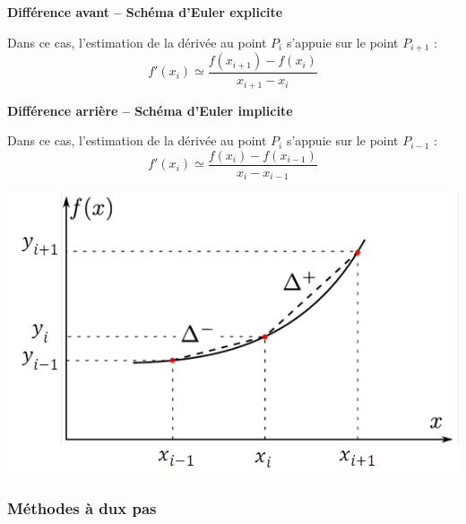 \documentclass[10pt]{article}
\begin{document}
\begin{minipage}[c]{.49\linewidth}
\begin{resultat}
\textbf{Différence avant -- Schéma d'Euler explicite}

Dans ce cas, l'estimation de la dérivée au point $P_i$ s'appuie sur le point $P_{i+1}$ :
$$
f'(x_i)\simeq\dfrac{f(x_{i+1})-f(x_i)}{x_{i+1}-x_i}
$$
\end{resultat}

\begin{resultat}
\textbf{Différence arrière -- Schéma d'Euler implicite}

Dans ce cas, l'estimation de la dérivée au point $P_i$ s'appuie sur le point $P_{i-1}$ :
$$
f'(x_i)\simeq\dfrac{f(x_{i})-f(x_{i-1})}{x_{i}-x_{i-1}}
$$
\end{resultat}
\end{minipage}\hfill
\begin{minipage}[c]{.49\linewidth}
\begin{center}
\includegraphics[width=\textwidth]{images/derivation_1pas}
\end{center}
\end{minipage}

\subsubsection{Méthodes à dux pas}
\end{document}
